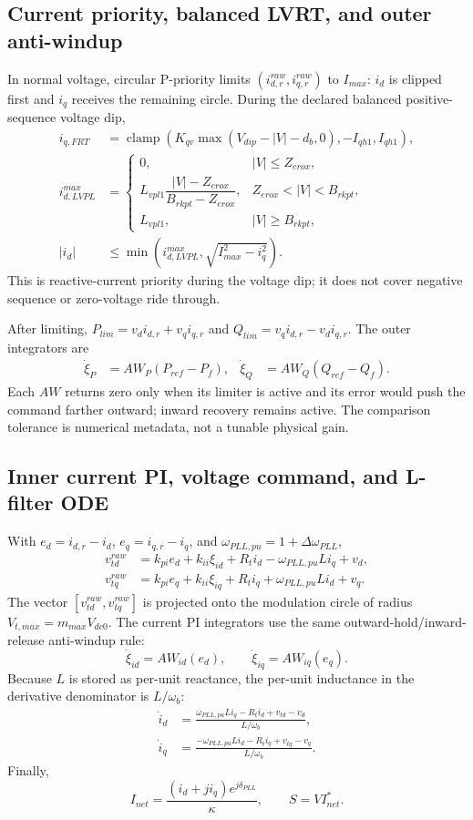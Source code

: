 \documentclass[12pt,a4paper]{article}
\newcommand{\clamp}{\operatorname{clamp}}
\begin{document}
\subsection{Current priority, balanced LVRT, and outer anti-windup}

In normal voltage, circular P-priority limits \((i_{d,r}^{raw},i_{q,r}^{raw})\)
to \(I_{max}\): \(i_d\) is clipped first and \(i_q\) receives the remaining
circle.  During the declared balanced positive-sequence voltage dip,
\begin{align}
i_{q,FRT}&=\clamp\!\left(K_{qv}\max(V_{dip}-|V|-d_b,0),-I_{qh1},I_{qh1}\right),\\
i_{d,LVPL}^{max}&=
\begin{cases}
0,&|V|\le Z_{erox},\\
L_{vpl1}\dfrac{|V|-Z_{erox}}{B_{rkpt}-Z_{erox}},&Z_{erox}<|V|<B_{rkpt},\\
L_{vpl1},&|V|\ge B_{rkpt},
\end{cases}\\
|i_d|&\le\min\!\left(i_{d,LVPL}^{max},\sqrt{I_{max}^2-i_q^2}\right).
\end{align}
This is reactive-current priority during the voltage dip; it does not cover
negative sequence or zero-voltage ride through.

After limiting, \(P_{lim}=v_di_{d,r}+v_qi_{q,r}\) and
\(Q_{lim}=v_qi_{d,r}-v_di_{q,r}\).  The outer integrators are
\begin{align}
\dot\xi_P&=AW_P(P_{ref}-P_f),&\dot\xi_Q&=AW_Q(Q_{ref}-Q_f).
\end{align}
Each \(AW\) returns zero only when its limiter is active and its error would
push the command farther outward; inward recovery remains active.  The
comparison tolerance is numerical metadata, not a tunable physical gain.

\subsection{Inner current PI, voltage command, and L-filter ODE}

With \(e_d=i_{d,r}-i_d\), \(e_q=i_{q,r}-i_q\), and
\(\omega_{PLL,pu}=1+\Delta\omega_{PLL}\),
\begin{align}
v_{td}^{raw}&=k_{pi}e_d+k_{ii}\xi_{id}+R_ti_d-\omega_{PLL,pu}Li_q+v_d,\\
v_{tq}^{raw}&=k_{pi}e_q+k_{ii}\xi_{iq}+R_ti_q+\omega_{PLL,pu}Li_d+v_q.
\end{align}
The vector \([v_{td}^{raw},v_{tq}^{raw}]\) is projected onto the modulation
circle of radius \(V_{t,max}=m_{max}V_{dc0}\).  The current PI integrators use
the same outward-hold/inward-release anti-windup rule:
\[
\dot\xi_{id}=AW_{id}(e_d),\qquad \dot\xi_{iq}=AW_{iq}(e_q).
\]
Because \(L\) is stored as per-unit reactance, the per-unit inductance in the
derivative denominator is \(L/\omega_b\):
\begin{align}
\dot i_d&=\frac{\omega_{PLL,pu}Li_q-R_ti_d+v_{td}-v_d}{L/\omega_b},\\
\dot i_q&=\frac{-\omega_{PLL,pu}Li_d-R_ti_q+v_{tq}-v_q}{L/\omega_b}.
\end{align}
Finally,
\[
I_{net}=\frac{(i_d+ji_q)e^{j\delta_{PLL}}}{\kappa},\qquad S=VI_{net}^*.
\]
\end{document}
